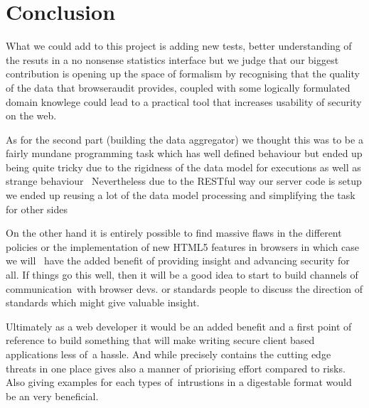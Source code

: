 
\chapter{Conclusion} 


What we could add to this project is adding new tests, better understanding of the resuts in a no nonsense statistics interface but we judge
that our biggest contribution is opening up the space of formalism by recognising that the quality of the data that browseraudit provides, coupled
with some logically formulated domain knowlege could lead to a practical tool that increases usability of security on the web.


As for the second part (building the data aggregator) we thought this was to be a fairly mundane programming task which has well defined behaviour
but ended up being quite tricky due to the rigidness of the data model for executions as well as strange behaviour  \
Nevertheless due to the RESTful way our server code is setup we ended up reusing a lot of the data model processing and simplifying the task
for other sides 

On the other hand it is entirely possible to find massive flaws in the different policies or the implementation of new HTML5 features in browsers in which case we will \
have the added benefit of providing insight and advancing security for all. If things go this well, then it will be a good idea to start to build channels of communication\
with browser devs. or standards people to discuss the direction of standards which might give valuable insight.\



Ultimately as a web developer it would be an added benefit and a first point of reference to build something that will make writing secure client based applications less of\
a hassle. And while precisely contains the cutting edge threats in one place gives also a manner of priorising effort compared to risks. Also giving examples for each types of\
intrustions in a digestable format would be an very beneficial.\

